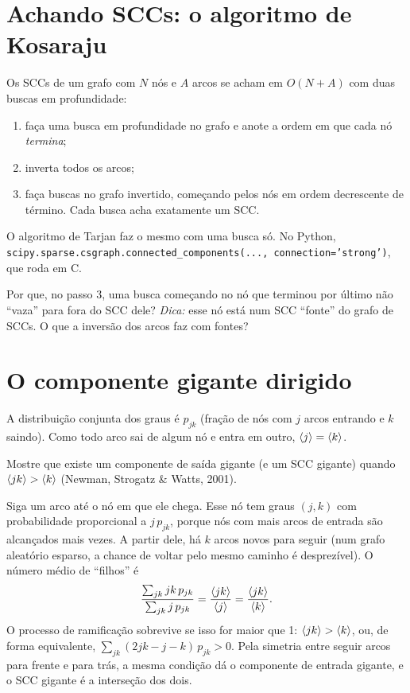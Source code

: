 \documentclass[11pt]{article}
\begin{document}
\section{Achando SCCs: o algoritmo de Kosaraju}

\begin{ideia}
Os SCCs de um grafo com $N$ nós e $A$ arcos se acham em $O(N+A)$ com duas buscas em profundidade:
\begin{enumerate}
  \item faça uma busca em profundidade no grafo e anote a ordem em que cada nó \emph{termina};
  \item inverta todos os arcos;
  \item faça buscas no grafo invertido, começando pelos nós em ordem decrescente de término. Cada busca acha exatamente um SCC.
\end{enumerate}
O algoritmo de Tarjan faz o mesmo com uma busca só. No Python, \texttt{scipy.sparse.csgraph.connected\_components(..., connection='strong')}, que roda em C.
\end{ideia}

 Por que, no passo 3, uma busca começando no nó que terminou por último não ``vaza'' para fora do SCC dele? \emph{Dica:} esse nó está num SCC ``fonte'' do grafo de SCCs. O que a inversão dos arcos faz com fontes?

\section{O componente gigante dirigido}

A distribuição conjunta dos graus é $p_{jk}$ (fração de nós com $j$ arcos entrando e $k$ saindo). Como todo arco sai de algum nó e entra em outro, $\left\langle j \right\rangle = \left\langle k \right\rangle$.

\begin{exemplo}
Mostre que existe um componente de saída gigante (e um SCC gigante) quando $\left\langle jk \right\rangle>\left\langle k \right\rangle$ (Newman, Strogatz \& Watts, 2001).
\end{exemplo}
\begin{solucao}
Siga um arco até o nó em que ele chega. Esse nó tem graus $(j,k)$ com probabilidade proporcional a $j\,p_{jk}$, porque nós com mais arcos de entrada são alcançados mais vezes. A partir dele, há $k$ arcos novos para seguir (num grafo aleatório esparso, a chance de voltar pelo mesmo caminho é desprezível). O número médio de ``filhos'' é
\[
\frac{\sum_{jk}jk\,p_{jk}}{\sum_{jk}j\,p_{jk}} = \frac{\left\langle jk \right\rangle}{\left\langle j \right\rangle} = \frac{\left\langle jk \right\rangle}{\left\langle k \right\rangle}.
\]
O processo de ramificação sobrevive se isso for maior que 1: $\left\langle jk \right\rangle>\left\langle k \right\rangle$, ou, de forma equivalente, $\sum_{jk}(2jk-j-k)\,p_{jk}>0$. Pela simetria entre seguir arcos para frente e para trás, a mesma condição dá o componente de entrada gigante, e o SCC gigante é a interseção dos dois.
\end{solucao}
\end{document}
